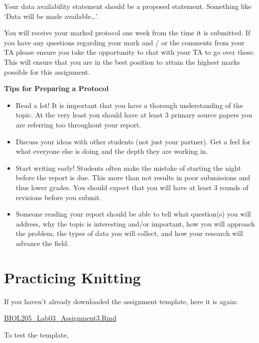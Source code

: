 \documentclass[
]{book}
\providecommand{\tightlist}{%
  \setlength{\itemsep}{0pt}\setlength{\parskip}{0pt}}
\begin{document}
Your data availability statement should be a proposed statement. Something like `Data will be made available\ldots{}'.

You will receive your marked protocol one week from the time it is submitted. If you have any questions regarding your mark and / or the comments from your TA please ensure you take the opportunity to chat with your TA to go over these. This will ensure that you are in the best position to attain the highest marks possible for this assignment.

\textbf{Tips for Preparing a Protocol}

\begin{itemize}
\tightlist
\item
  Read a lot! It is important that you have a thorough understanding of the topic. At the very least you should have at least 3 primary source papers you are referring too throughout your report.
\item
  Discuss your ideas with other students (not just your partner). Get a feel for what everyone else is doing and the depth they are working in.
\item
  Start writing early! Students often make the mistake of starting the night before the report is due. This more than not results in poor submissions and thus lower grades. You should expect that you will have at least 3 rounds of revisions before you submit.
\item
  Someone reading your report should be able to tell what question(s) you will address, why the topic is interesting and/or important, how you will approach the problem, the types of data you will collect, and how your research will advance the field.
\end{itemize}

\hypertarget{practicing-knitting}{%
\section*{Practicing Knitting}\label{practicing-knitting}}

If you haven't already downloaded the assignment template, here it is again:

\href{https://osf.io/download/qhc2v}{BIOL205\_Lab03\_Assignment3.Rmd}

To test the template,
\end{document}
